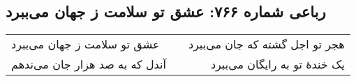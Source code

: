 \begin{center}
\section*{رباعی شماره ۷۶۶: عشق تو سلامت ز جهان می‌ببرد}
\label{sec:0766}
\begin{longtable}{l p{0.5cm} r}
عشق تو سلامت ز جهان می‌ببرد
&&
هجر تو اجل گشته که جان می‌ببرد
\\
آندل که به صد هزار جان می‌ندهم
&&
یک خندهٔ تو به رایگان می‌ببرد
\\
\end{longtable}
\end{center}
